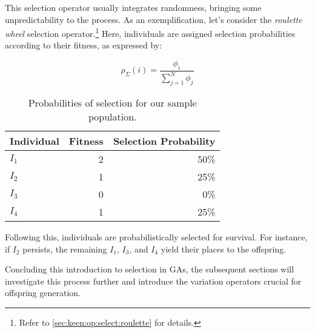   This selection operator usually integrates randomness, bringing some unpredictability to the process.
  As an exemplification, let's consider the \textit{roulette wheel} selection operator.\footnote{
    Refer to \vref{sec:keen:op:select:roulette} for details.
  } Here, individuals are assigned selection probabilities according to their fitness, as expressed by:

  \begin{equation}
    \label{eq:selection_probability}
    \rho_\Sigma(i) = \frac{\phi_i}{\sum_{j=1}^{N}\phi_j}
  \end{equation}

  \begin{table}[ht!]
    \centering
    \begin{tabular}{|l|r|r|}
      \hline
      Individual & Fitness & Selection Probability \\
      \hline
      \(I_1\)    & 2       & 50\% \\
      \(I_2\)    & 1       & 25\% \\
      \(I_3\)    & 0       & 0\%  \\
      \(I_4\)    & 1       & 25\% \\
      \hline
    \end{tabular}
    \caption{Probabilities of selection for our sample population.}
    \label{tab:selection_probabilities}
  \end{table}

  Following this, individuals are probabilistically selected for survival.
  For instance, if \(I_2\) persists, the remaining \(I_1\), \(I_3\), and \(I_4\) 
  yield their places to the offspring.

  Concluding this introduction to selection in GAs, the subsequent sections will 
  investigate this process further and introduce the variation operators crucial 
  for offspring generation.
  